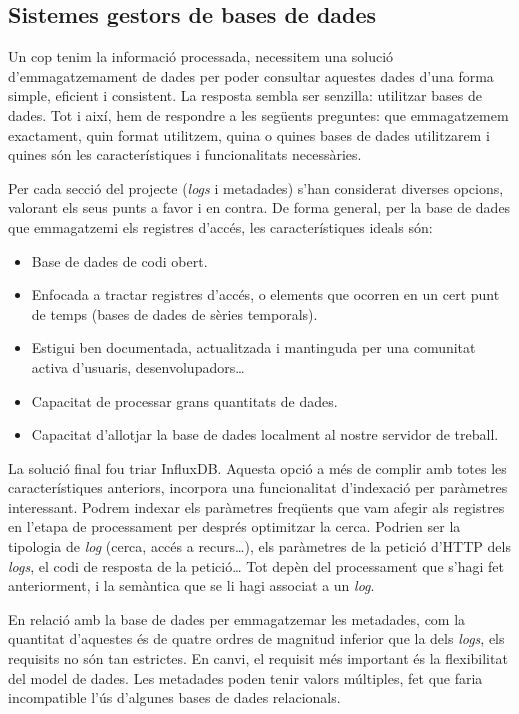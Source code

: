 \documentclass[lettersize,journal]{IEEEtran}
\begin{document}
\subsection{Sistemes gestors de bases de dades}\label{subsec:data-storing-requirements}
Un cop tenim la informació processada, necessitem una solució d'emmagatzemament de dades per poder consultar aquestes dades d'una forma simple, eficient i consistent.
La resposta sembla ser senzilla: utilitzar bases de dades.
Tot i així, hem de respondre a les següents preguntes: que emmagatzemem exactament, quin format utilitzem, quina o quines bases de dades utilitzarem i quines són les característiques i funcionalitats necessàries.

Per cada secció del projecte (\textit{logs} i metadades) s'han considerat diverses opcions, valorant els seus punts a favor i en contra.
De forma general, per la base de dades que emmagatzemi els registres d'accés, les característiques ideals són:
\begin{itemize}
    \item Base de dades de codi obert.
    \item Enfocada a tractar registres d'accés, o elements que ocorren en un cert punt de temps (bases de dades de sèries temporals).
    \item Estigui ben documentada, actualitzada i mantinguda per una comunitat activa d'usuaris, desenvolupadors\dots
    \item Capacitat de processar grans quantitats de dades.
    \item Capacitat d'allotjar la base de dades localment al nostre servidor de treball.
\end{itemize}

La solució final fou triar InfluxDB.
Aquesta opció a més de complir amb totes les característiques anteriors, incorpora una funcionalitat d'indexació per paràmetres interessant.
Podrem indexar els paràmetres freqüents que vam afegir als registres en l'etapa de processament per després optimitzar la cerca.
Podrien ser la tipologia de \textit{log} (cerca, accés a recurs\dots), els paràmetres de la petició d'HTTP dels \textit{logs}, el codi de resposta de la petició\dots
Tot depèn del processament que s'hagi fet anteriorment, i la semàntica que se li hagi associat a un \textit{log}.

En relació amb la base de dades per emmagatzemar les metadades, com la quantitat d'aquestes és de quatre ordres de magnitud inferior que la dels \textit{logs}, els requisits no són tan estrictes.
En canvi, el requisit més important és la flexibilitat del model de dades.
Les metadades poden tenir valors múltiples, fet que faria incompatible l'ús d'algunes bases de dades relacionals.
\end{document}
